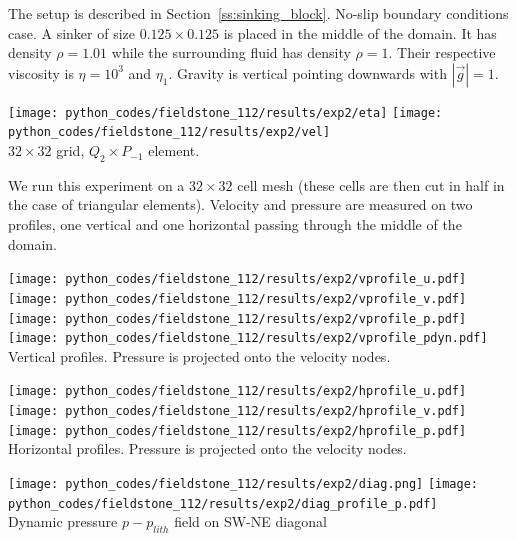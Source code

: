 The setup is described in Section~\ref{ss:sinking_block}. No-slip boundary conditions case.
A sinker of size $0.125\times 0.125$ is placed in the middle of the domain. It has density
$\rho=1.01$ while the surrounding fluid has density $\rho=1$. Their respective viscosity is
$\eta=10^3$ and $\eta_1$. Gravity is vertical pointing downwards with $|\vec g|=1$.


\begin{center}
\texttt{[image: python\_codes/fieldstone\_112/results/exp2/eta]}
\texttt{[image: python\_codes/fieldstone\_112/results/exp2/vel]}\\
{\captionfont $32\times 32$ grid, $Q_2\times P_{-1}$ element.}
\end{center}

We run this experiment on a $32\times 32$ cell mesh (these cells are then cut in half
in the case of triangular elements). Velocity and pressure are measured on two profiles,
one vertical and one horizontal passing through the middle of the domain.   

\begin{center}
\texttt{[image: python\_codes/fieldstone\_112/results/exp2/vprofile\_u.pdf]}
\texttt{[image: python\_codes/fieldstone\_112/results/exp2/vprofile\_v.pdf]}\\
\texttt{[image: python\_codes/fieldstone\_112/results/exp2/vprofile\_p.pdf]}
\texttt{[image: python\_codes/fieldstone\_112/results/exp2/vprofile\_pdyn.pdf]}\\
{\captionfont Vertical profiles. Pressure is projected onto the velocity nodes.}
\end{center}

\begin{center}
\texttt{[image: python\_codes/fieldstone\_112/results/exp2/hprofile\_u.pdf]}
\texttt{[image: python\_codes/fieldstone\_112/results/exp2/hprofile\_v.pdf]}
\texttt{[image: python\_codes/fieldstone\_112/results/exp2/hprofile\_p.pdf]}\\
{\captionfont Horizontal profiles. Pressure is projected onto the velocity nodes.}
\end{center}

\begin{center}
\texttt{[image: python\_codes/fieldstone\_112/results/exp2/diag.png]}
\texttt{[image: python\_codes/fieldstone\_112/results/exp2/diag\_profile\_p.pdf]}\\
{\captionfont Dynamic pressure $p-p_{lith}$ field on SW-NE diagonal}
\end{center}


